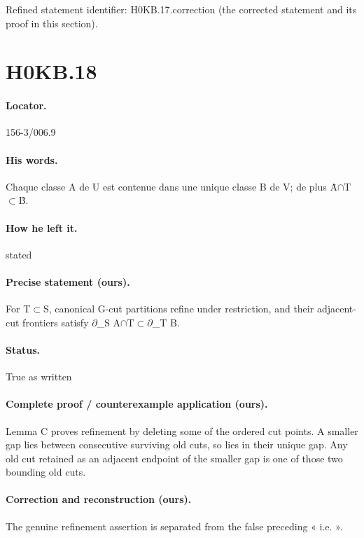 \noindent Refined statement identifier: H0KB.17.correction (the corrected statement and its proof in this section).

\section*{H0KB.18}\label{statement:H0KB.18}
\paragraph{Locator.} 156-3/006.9

\paragraph{His words.} Chaque classe A de U est contenue dans une unique classe B de V; de plus Ȧ\ensuremath{\cap}T\ensuremath{\subset}Ḃ.

\paragraph{How he left it.} stated

\paragraph{Precise statement (ours).} For T\ensuremath{\subset}S, canonical G-cut partitions refine under restriction, and their adjacent-cut frontiers satisfy \ensuremath{\partial}\_S A\ensuremath{\cap}T\ensuremath{\subset}\ensuremath{\partial}\_T B.

\paragraph{Status.} True as written

\paragraph{Complete proof / counterexample application (ours).} Lemma C proves refinement by deleting some of the ordered cut points. A smaller gap lies between consecutive surviving old cuts, so lies in their unique gap. Any old cut retained as an adjacent endpoint of the smaller gap is one of those two bounding old cuts.

\paragraph{Correction and reconstruction (ours).} The genuine refinement assertion is separated from the false preceding « i.e. ».

